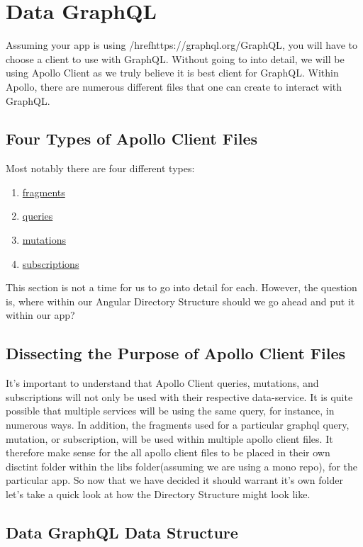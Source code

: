 \section{ Data GraphQL }
\maketitle{}

Assuming your app is using /href{https://graphql.org/}{GraphQL}, you will have
to choose a client to use with GraphQL. Without going to into detail, we will be
using Apollo Client as we truly believe it is best client for GraphQL. Within
Apollo, there are numerous different files that one can create to interact
with GraphQL.

\subsection{Four Types of Apollo Client Files}
Most notably there are four different types:
\begin{enumerate}
  \item \href{https://www.apollographql.com/docs/angular/features/fragments}{fragments}
  \item \href{https://www.apollographql.com/docs/angular/basics/queries/}{queries}
  \item \href{https://www.apollographql.com/docs/angular/basics/mutations}{mutations}
  \item \href{https://www.apollographql.com/docs/angular/features/subscriptions}{subscriptions}
\end{enumerate}

This section is not a time for us to go into detail for each. However, the
question is, where within our Angular Directory Structure should we go ahead and
put it within our app?

\subsection{Dissecting the Purpose of Apollo Client Files}
It's important to understand that Apollo Client queries, mutations, and
subscriptions will not only be used with their respective data-service. It is
quite possible that multiple services will be using the same query, for
instance, in numerous ways. In addition, the fragments used for a particular
graphql query, mutation, or subscription, will be used within multiple apollo
client files. It therefore make sense for the all apollo client files to be
placed in their own disctint folder within the libs folder(assuming we are using
a mono repo), for the particular app. So now that we have decided it should
warrant it's own folder let's take a quick look at how the Directory Structure
might look like.

\subsection{Data GraphQL Data Structure}

